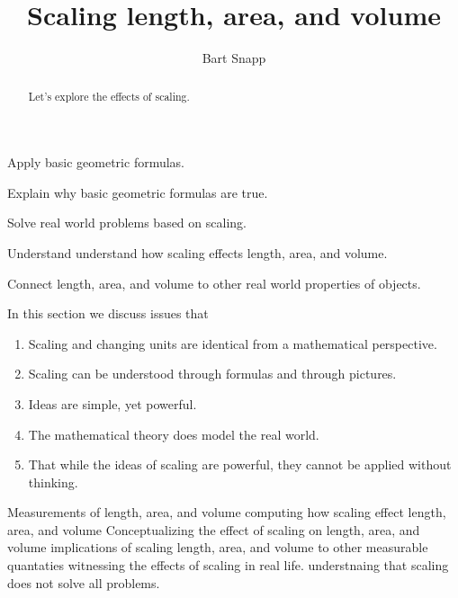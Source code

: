 \documentclass[handout,nooutcomes,noauthor]{ximera}
\title{Scaling length, area, and volume}
\author{Bart Snapp}
\begin{document}
\begin{abstract}
  Let's explore the effects of scaling.
\end{abstract}
\maketitle


\begin{listSectionOutcomes}
\item Apply basic geometric formulas. 
\item Explain why basic geometric formulas are true.
\item Solve real world problems based on scaling.
\item Understand understand how scaling effects length, area, and
  volume.
\item Connect length, area, and volume to other real world properties
  of objects.
\end{listSectionOutcomes}

In this section we discuss issues that

\begin{enumerate}
\item Scaling and changing units are identical from a mathematical
  perspective.
\item Scaling can be understood through formulas and through pictures.
\item Ideas are simple, yet powerful.
\item The mathematical theory does model the real world.
\item That while the ideas of scaling are powerful, they cannot be
  applied without thinking.
\end{enumerate}



Measurements of length, area, and volume
computing how  scaling effect length, area, and volume
Conceptualizing the effect of scaling on  length, area, and volume
implications of scaling  length, area, and volume to other measurable quantaties
witnessing the effects of scaling in real life.
understnaing that scaling does not solve all problems.
\end{document}
